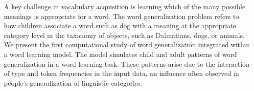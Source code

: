 A key challenge in vocabulary acquisition is learning which of the many possible meanings is appropriate for a word. The word generalization problem refers to how children associate a word such as dog with a meaning at the appropriate category level in the taxonomy of objects, such as Dalmatians, dogs, or animals. We present the first computational study of word generalization integrated within a word learning model. The model simulates child and adult patterns of word generalization in a word-learning task. These patterns arise due to the interaction of type and token frequencies in the input data, an influence often observed in people's generalization of linguistic categories.
